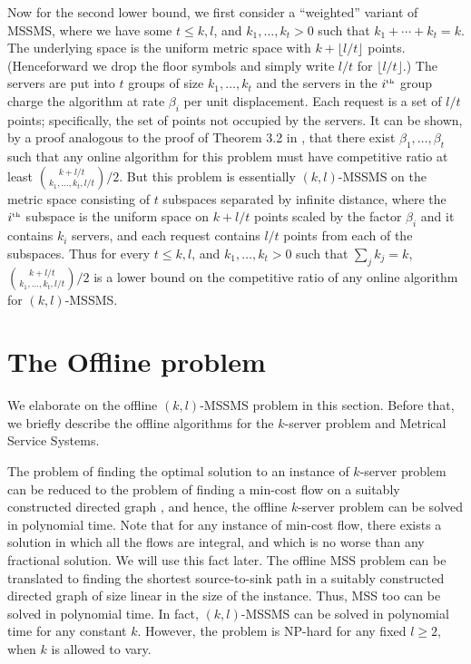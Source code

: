 \documentclass[11pt]{article}
\theoremstyle{plain}\newtheorem{theorem}{Theorem}
\theoremstyle{definition}
\theoremstyle{remark}
\begin{document}
Now for the second lower bound, we first consider a ``weighted'' variant of MSSMS, where we have some $t\leq k,l$, and $k_1,\ldots,k_t>0$ such that $k_1+\cdots+k_t=k$. The underlying space is the uniform metric space with $k+\lfloor l/t\rfloor$ points. (Henceforward we drop the floor symbols and simply write $l/t$ for $\lfloor l/t\rfloor$.) The servers are put into $t$ groups of size $k_1,\ldots,k_t$ and the servers in the $i^{\text{\tiny{th}}}$ group charge the algorithm at rate $\beta_i$ per unit displacement. Each request is a set of $l/t$ points; specifically, the set of points not occupied by the servers. It can be shown, by a proof analogous to the proof of Theorem 3.2 in \cite{FiatR94}, that there exist $\beta_1,\ldots,\beta_t$ such that any online algorithm for this problem must have competitive ratio at least ${{k+l/t}\choose{k_1,\ldots,k_t,l/t}}/2$. But this problem is essentially $(k,l)$-MSSMS on the metric space consisting of $t$ subspaces separated by infinite distance, where the $i^{\text{\tiny{th}}}$ subspace is the uniform space on $k+l/t$ points scaled by the factor $\beta_i$ and it contains $k_i$ servers, and each request contains $l/t$ points from each of the subspaces. Thus for every $t\leq k,l$, and $k_1,\ldots,k_t>0$ such that $\sum_j k_j=k$, ${{k+l/t}\choose{k_1,\ldots,k_t,l/t}}/2$ is a lower bound on the competitive ratio of any online algorithm for $(k,l)$-MSSMS.

\section{The Offline problem}\label{sec_offline}

We elaborate on the offline $(k,l)$-MSSMS problem in this section. Before that, we briefly describe the offline algorithms for the $k$-server problem and Metrical Service Systems.

The problem of finding the optimal solution to an instance of $k$-server problem can be reduced to the problem of finding a min-cost flow on a suitably constructed directed graph \cite{ChrobakKPV91}, and hence, the offline $k$-server problem can be solved in polynomial time. Note that for any instance of min-cost flow, there exists a solution in which all the flows are integral, and which is no worse than any fractional solution. We will use this fact later. The offline MSS problem can be translated to finding the shortest source-to-sink path in a suitably constructed directed graph of size linear in the size of the instance. Thus, MSS too can be solved in polynomial time. In fact, $(k,l)$-MSSMS can be solved in polynomial time for any constant $k$. However, the problem is NP-hard for any fixed $l\geq2$, when $k$ is allowed to vary.
\end{document}
